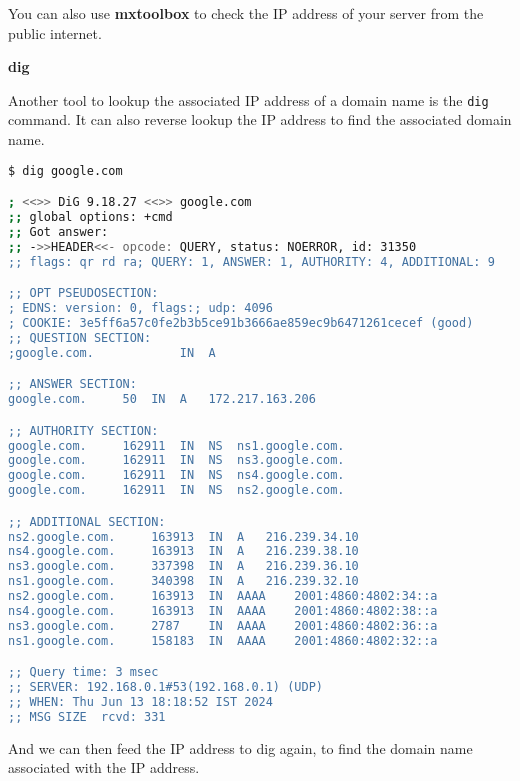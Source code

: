 You can also use \textbf{mxtoolbox} to check the
IP address of your server from the public internet.

\textbf{dig}

Another tool to lookup the associated IP address of
a domain name is the \lstinline|dig| command.
It can also reverse lookup the IP address to find
the associated domain name.

\begin{lstlisting}[language=bash]
$ dig google.com

; <<>> DiG 9.18.27 <<>> google.com
;; global options: +cmd
;; Got answer:
;; ->>HEADER<<- opcode: QUERY, status: NOERROR, id: 31350
;; flags: qr rd ra; QUERY: 1, ANSWER: 1, AUTHORITY: 4, ADDITIONAL: 9

;; OPT PSEUDOSECTION:
; EDNS: version: 0, flags:; udp: 4096
; COOKIE: 3e5ff6a57c0fe2b3b5ce91b3666ae859ec9b6471261cecef (good)
;; QUESTION SECTION:
;google.com.			IN	A

;; ANSWER SECTION:
google.com.		50	IN	A	172.217.163.206

;; AUTHORITY SECTION:
google.com.		162911	IN	NS	ns1.google.com.
google.com.		162911	IN	NS	ns3.google.com.
google.com.		162911	IN	NS	ns4.google.com.
google.com.		162911	IN	NS	ns2.google.com.

;; ADDITIONAL SECTION:
ns2.google.com.		163913	IN	A	216.239.34.10
ns4.google.com.		163913	IN	A	216.239.38.10
ns3.google.com.		337398	IN	A	216.239.36.10
ns1.google.com.		340398	IN	A	216.239.32.10
ns2.google.com.		163913	IN	AAAA	2001:4860:4802:34::a
ns4.google.com.		163913	IN	AAAA	2001:4860:4802:38::a
ns3.google.com.		2787	IN	AAAA	2001:4860:4802:36::a
ns1.google.com.		158183	IN	AAAA	2001:4860:4802:32::a

;; Query time: 3 msec
;; SERVER: 192.168.0.1#53(192.168.0.1) (UDP)
;; WHEN: Thu Jun 13 18:18:52 IST 2024
;; MSG SIZE  rcvd: 331
\end{lstlisting}

And we can then feed the IP address to dig again, to find
the domain name associated with the IP address.

